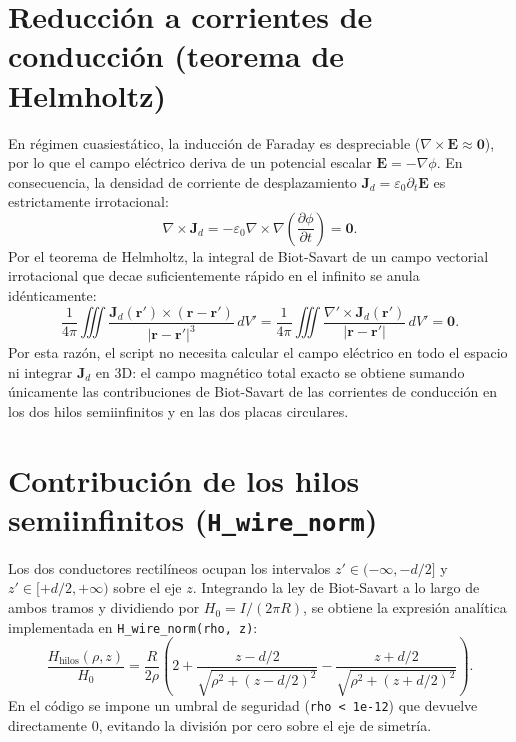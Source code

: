 \documentclass[11pt]{article}
\begin{document}
\section{Reducción a corrientes de conducción (teorema de Helmholtz)}

En régimen cuasiestático, la inducción de Faraday es despreciable ($\nabla \times \mathbf{E} \approx \mathbf{0}$), por lo que el campo eléctrico deriva de un potencial escalar $\mathbf{E} = -\nabla\phi$. En consecuencia, la densidad de corriente de desplazamiento $\mathbf{J}_d = \varepsilon_0 \partial_t \mathbf{E}$ es estrictamente irrotacional:
\begin{equation}
    \nabla \times \mathbf{J}_d = -\varepsilon_0 \nabla \times \nabla\left(\frac{\partial \phi}{\partial t}\right) = \mathbf{0}.
\end{equation}
Por el teorema de Helmholtz, la integral de Biot-Savart de un campo vectorial irrotacional que decae suficientemente rápido en el infinito se anula idénticamente:
\begin{equation}
    \frac{1}{4\pi} \iiint \frac{\mathbf{J}_d(\mathbf{r}') \times (\mathbf{r} - \mathbf{r}')}{|\mathbf{r} - \mathbf{r}'|^3}\,dV' = \frac{1}{4\pi} \iiint \frac{\nabla' \times \mathbf{J}_d(\mathbf{r}')}{|\mathbf{r} - \mathbf{r}'|}\,dV' = \mathbf{0}.
\end{equation}
Por esta razón, el script no necesita calcular el campo eléctrico en todo el espacio ni integrar $\mathbf{J}_d$ en 3D: el campo magnético total exacto se obtiene sumando únicamente las contribuciones de Biot-Savart de las corrientes de conducción en los dos hilos semiinfinitos y en las dos placas circulares.

\section{Contribución de los hilos semiinfinitos (\texttt{H\_wire\_norm})}

Los dos conductores rectilíneos ocupan los intervalos $z' \in (-\infty, -d/2]$ y $z' \in [+d/2, +\infty)$ sobre el eje $z$. Integrando la ley de Biot-Savart a lo largo de ambos tramos y dividiendo por $H_0 = I/(2\pi R)$, se obtiene la expresión analítica implementada en \texttt{H\_wire\_norm(rho, z)}:
\begin{equation}
    \frac{H_{\mathrm{hilos}}(\rho, z)}{H_0} = \frac{R}{2\rho} \left( 2 + \frac{z - d/2}{\sqrt{\rho^2 + (z - d/2)^2}} - \frac{z + d/2}{\sqrt{\rho^2 + (z + d/2)^2}} \right).
\end{equation}
En el código se impone un umbral de seguridad (\texttt{rho < 1e-12}) que devuelve directamente $0$, evitando la división por cero sobre el eje de simetría.
\end{document}
